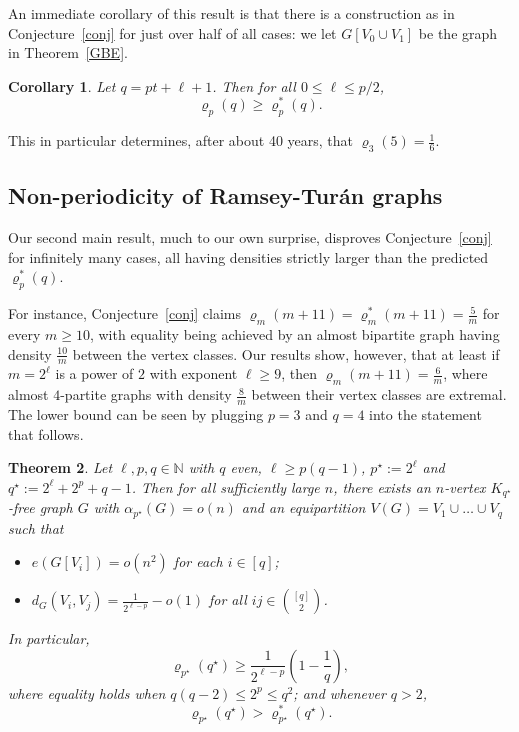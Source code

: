 \documentclass[10pt,a4paper]{article}
\newtheorem{theorem}{Theorem}[section]
\newtheorem{corollary}[theorem]{Corollary}
\theoremstyle{definition}
\begin{document}
An immediate corollary of this result is that there is a construction as in Conjecture~\ref{conj} for just over half of all cases: we let $G[V_0 \cup V_1]$ be the graph in Theorem~\ref{GBE}.


\begin{corollary}\label{cor}
	Let $q = pt+\ell+1$. Then for all $0 \leq \ell \leq p/2$, 
	$$\varrho_p(q) \geq \varrho_p^*(q).$$
\end{corollary}

This in particular determines, after about 40 years, that $\varrho_3(5)=\frac{1}{6}$.

\subsection{Non-periodicity of Ramsey-Tur\'an graphs}
Our second main result, much to our own surprise, disproves Conjecture~\ref{conj} for infinitely many cases, all having densities strictly larger than the predicted $\varrho_p^*(q)$. 

For instance, Conjecture~\ref{conj} claims $\varrho_m(m+11)=\varrho_m^*(m+11)=\frac{5}{m}$
for every $m \geq 10$, with equality being achieved by an almost bipartite graph having density $\frac{10}{m}$ between the vertex classes. Our results show, however, that at least if $m=2^\ell$ is a power of $2$ with exponent $\ell \geq 9$, then $\varrho_m(m+11)=\frac{6}{m}$, where almost $4$-partite graphs with density $\frac{8}{m}$ between their vertex classes are extremal. The lower bound can be seen by plugging $p=3$ and $q=4$ into the statement that follows.

\begin{theorem}\label{thm-2tri-exact}
	Let $\ell,p,q\in\mathbb{N}$ with $q$ even, $\ell \geq p(q-1)$, $p^{\star}:=2^\ell$ and $q^{\star}:=2^\ell+2^p+q-1$. Then for all sufficiently large $n$, there exists an $n$-vertex $K_{q^{\star}}$-free graph $G$ with $\alpha_{p^{\star}}(G)=o(n)$ and an  equipartition $V(G)=V_1\cup\ldots\cup V_q$ such that
	\begin{itemize}
		\item $e(G[V_i])=o(n^2)$ for each $i\in[q]$;
		
		\item $d_G(V_i,V_j)=\frac{1}{2^{\ell-p}}-o(1)$ for all $ij\in{[q]\choose 2}$.
	\end{itemize}
	In particular, 
	\begin{equation}\label{eq:multi-lower}
		\varrho_{p^{\star}}(q^{\star})\ge\frac{1}{2^{\ell-p}}\left(1-\frac{1}{q}\right),
	\end{equation}
	where equality holds when $q(q-2)\le 2^p\le q^2$; and whenever $q > 2$, $$\varrho_{p^{\star}}(q^{\star}) > \varrho_{p^{\star}}^*(q^{\star}).$$
\end{theorem}
\end{document}
